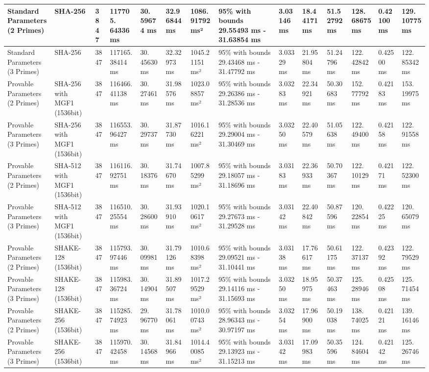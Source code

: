 \documentclass[]{final_report}
\theoremstyle{definition}
\begin{document}
\begin{landscape}
\begin{longtable}{|p{2.3cm}|p{1.8cm}|p{1.0cm}|p{1.7cm}|p{1.2cm}|p{1.5cm}|p{1.8cm}|p{1.5cm}|p{1.2cm}|p{1.5cm}|p{1.3cm}|p{1.2cm}|p{1.3cm}|p{1.3cm}|}
\hline
\endlastfoot
Standard Parameters (2 Primes) & SHA-256 & 3847 & 117705.
64336 ms & 30.
59674 ms & 32.96844 ms & 1086.91792 ms² & 95\% with bounds 29.55493 ms - 31.63854 ms & 3.03146 ms & 18.44171 ms & 51.52792 ms & 128.
68675 ms & 0.42100 ms & 129.
10775 ms \\
\hline
Standard Parameters (3 Primes) & SHA-256 & 3847 & 117165.
38414 ms & 30.
45630 ms & 32.32973 ms & 1045.21151 ms² & 95\% with bounds 29.43468 ms - 31.47792 ms & 3.03329 ms & 21.95804 ms & 51.24796 ms & 122.
42842 ms & 0.42500 ms & 122.
85342 ms \\
\hline
Provable Parameters (2 Primes) & SHA-256 with MGF1 (1536bit) & 3847 & 116466.
41138 ms & 30.
27461 ms & 31.98576 ms & 1023.08857 ms² & 95\% with bounds 29.26386 ms - 31.28536 ms & 3.03283 ms & 22.34921 ms & 50.30683 ms & 152.
77792 ms & 0.42183 ms & 153.
19975 ms \\
\hline
Provable Parameters (3 Primes) & SHA-256 with MGF1 (1536bit) & 3847 & 116553.
96427 ms & 30.
29737 ms & 31.87730 ms & 1016.16221 ms² & 95\% with bounds 29.29004 ms - 31.30469 ms & 3.03250 ms & 22.40579 ms & 51.05638 ms & 122.
49400 ms & 0.42158 ms & 122.
91558 ms \\
\hline
Provable Parameters (2 Primes) & SHA-512 with MGF1 (1536bit) & 3847 & 116116.
92751 ms & 30.
18376 ms & 31.74670 ms & 1007.85299 ms² & 95\% with bounds 29.18057 ms - 31.18696 ms & 3.03183 ms & 22.36933 ms & 50.70367 ms & 122.
10129 ms & 0.42171 ms & 122.
52300 ms \\
\hline
Provable Parameters (3 Primes) & SHA-512 with MGF1 (1536bit) & 3847 & 116510.
25554 ms & 30.
28600 ms & 31.93910 ms & 1020.10617 ms² & 95\% with bounds 29.27673 ms - 31.29528 ms & 3.03142 ms & 22.40842 ms & 50.87596 ms & 120.
22854 ms & 0.42225 ms & 120.
65079 ms \\
\hline
Provable Parameters (2 Primes) & SHAKE-128 (1536bit) & 3847 & 115793.
97446 ms & 30.
09981 ms & 31.79126 ms & 1010.68398 ms² & 95\% with bounds 29.09521 ms - 31.10441 ms & 3.03138 ms & 17.76617 ms & 50.61175 ms & 122.
37137 ms & 0.42392 ms & 122.
79529 ms \\
\hline
Provable Parameters (3 Primes) & SHAKE-128 (1536bit) & 3847 & 115983.
36724 ms & 30.
14904 ms & 31.89507 ms & 1017.29529 ms² & 95\% with bounds 29.14116 ms - 31.15693 ms & 3.03250 ms & 18.95975 ms & 50.37463 ms & 125.
28946 ms & 0.42508 ms & 125.
71454 ms \\
\hline
Provable Parameters (2 Primes) & SHAKE-256 (1536bit) & 3847 & 115285.
74923 ms & 29.
96770 ms & 31.78061 ms & 1010.00743 ms² & 95\% with bounds 28.96343 ms - 30.97197 ms & 3.03254 ms & 17.96900 ms & 50.19038 ms & 138.
74025 ms & 0.42121 ms & 139.
16146 ms \\
\hline
Provable Parameters (3 Primes) & SHAKE-256 (1536bit) & 3847 & 115970.
42458 ms & 30.
14568 ms & 31.84966 ms & 1014.40085 ms² & 95\% with bounds 29.13923 ms - 31.15213 ms & 3.03142 ms & 17.09983 ms & 50.35596 ms & 124.
84604 ms & 0.42142 ms & 125.
26746 ms \\
\hline


\end{longtable}
\end{landscape}
\end{document}

